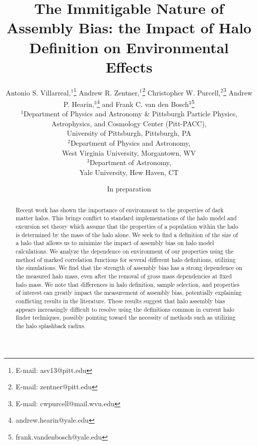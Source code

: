 \documentclass[usenatbib]{mnras}
\begin{document}
\title[The Immitigable Nature of Assembly Bias]{The Immitigable Nature of Assembly
Bias: the Impact of Halo Definition on Environmental Effects}
\author[A. Villarreal et al.]{
Antonio S. Villarreal,$^{1}$\thanks{E-mail: asv13@pitt.edu}
Andrew R. Zentner,$^{1}$\thanks{E-mail: zentner@pitt.edu}
Christopher W. Purcell,$^{2}$\thanks{E-mail: cwpurcell@mail.wvu.edu}
\newauthor
Andrew P. Hearin,$^{3}$\thanks{andrew.hearin@yale.edu}
and Frank C. van den Bosch$^{3}$\thanks{frank.vandenbosch@yale.edu} 
\\
$^{1}$Department of Physics and Astronomy \& Pittsburgh Particle Physics,\\ Astrophysics, and Cosmology Center (Pitt-PACC), \\
University of Pittsburgh, Pittsburgh, PA\\
$^{2}$Department of Physics and Astronomy, \\
West Virginia University, Morgantown, WV \\
$^{3}$Department of Astronomy, \\
Yale University, Hew Haven, CT}

\date{In preparation}



\maketitle

\begin{abstract}
Recent work has shown the importance of environment to the properties of dark matter halos. This brings conflict
to standard implementations of the halo model and excursion set theory which assume that the properties of a
population within the halo is determined by the mass of the halo alone. We seek to find a definition of the size
of a halo that allows us to minimize the impact of assembly bias on halo model calculations. We analyze the
dependence on environment of our properties using the method of marked correlation functions for several
different halo definitions, utilizing the \citet{diemer_kravtsov15} simulations. We find that the strength of assembly
bias has a strong dependence on the measured halo mass, even after the removal of gross mass dependencies at fixed
halo mass. We note that differences in halo definition, sample selection, and properties of interest can greatly impact
the measurement of assembly bias, potentially explaining conflicting results in the literature. These results suggest that
halo assembly bias appears increasingly difficult to resolve using the definitions common in current halo finder techniques,
possibly pointing toward the necessity of methods such as utilizing the halo splashback radius.
\end{abstract}
\end{document}
